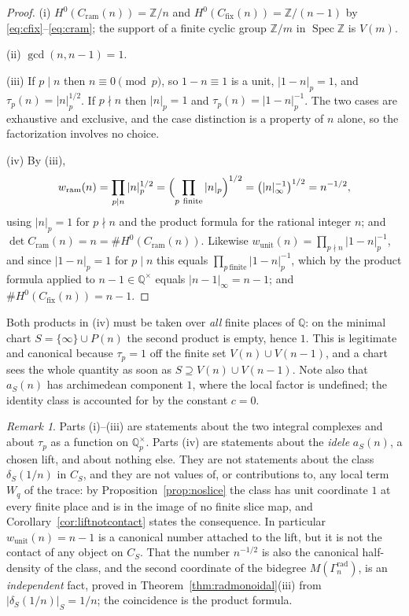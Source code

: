 \documentclass[11pt]{amsart}
\theoremstyle{definition}
\theoremstyle{remark}
\newtheorem{remark}[theorem]{Remark}
\newcommand{\Z}{\mathbb Z}
\newcommand{\Q}{\mathbb Q}
\newcommand{\Spec}{\operatorname{Spec}}
\begin{document}
\begin{proof}
(i) $H^0(C_{\mathrm{ram}}(n))=\Z/n$ and $H^0(C_{\mathrm{fix}}(n))=\Z/(n-1)$ by
\eqref{eq:cfix}--\eqref{eq:cram}; the support of a finite cyclic group $\Z/m$
in $\Spec\Z$ is $V(m)$.

(ii) $\gcd(n,n-1)=1$.

(iii) If $p\mid n$ then $n\equiv0\pmod p$, so $1-n\equiv1$ is a unit,
$|1-n|_p=1$, and $\tau_p(n)=|n|_p^{1/2}$. If $p\nmid n$ then $|n|_p=1$ and
$\tau_p(n)=|1-n|_p^{-1}$. The two cases are exhaustive and exclusive, and the
case distinction is a property of $n$ alone, so the factorization involves no
choice.

(iv) By (iii),
\[
  w_{\mathrm{ram}}(n)=\prod_{p\mid n}|n|_p^{1/2}
   =\Bigl(\prod_{p\ \mathrm{finite}}|n|_p\Bigr)^{1/2}
   =\bigl(|n|_\infty^{-1}\bigr)^{1/2}=n^{-1/2},
\]
using $|n|_p=1$ for $p\nmid n$ and the product formula for the rational integer
$n$; and $\det C_{\mathrm{ram}}(n)=n=\#H^0(C_{\mathrm{ram}}(n))$. Likewise
$w_{\mathrm{unit}}(n)=\prod_{p\nmid n}|1-n|_p^{-1}$, and since $|1-n|_p=1$ for
$p\mid n$ this equals $\prod_{p\ \mathrm{finite}}|1-n|_p^{-1}$, which by the
product formula applied to $n-1\in\Q^\times$ equals $|n-1|_\infty=n-1$; and
$\#H^0(C_{\mathrm{fix}}(n))=n-1$.
\end{proof}

Both products in (iv) must be taken over \emph{all} finite places of $\Q$: on
the minimal chart $S=\{\infty\}\cup P(n)$ the second product is empty, hence
$1$. This is legitimate and canonical because $\tau_p=1$ off the finite set
$V(n)\cup V(n-1)$, and a chart sees the whole quantity as soon as
$S\supseteq V(n)\cup V(n-1)$.  Note also that $a_S(n)$ has archimedean
component $1$, where the local factor is undefined; the identity class is
accounted for by the constant $c=0$.

\begin{remark}\label{rem:aboutthelift}
Parts (i)--(iii) are statements about the two integral complexes and about
$\tau_p$ as a function on $\Q_p^\times$. Parts (iv) are statements about the
\emph{idele} $a_S(n)$, a chosen lift, and about nothing else. They are not
statements about the class $\delta_S(1/n)$ in $C_S$, and they are not
values of, or contributions to, any local term $W_q$ of the trace: by
Proposition~\ref{prop:noslice} the class has unit coordinate $1$ at every
finite place and is in the image of no finite slice map, and
Corollary~\ref{cor:liftnotcontact} states the consequence.  In particular
$w_{\mathrm{unit}}(n)=n-1$ is a canonical number attached to the lift, but it
is not the contact of any object on $C_S$. That the number $n^{-1/2}$
is also the canonical half-density of the class, and the second coordinate of
the bidegree $M(\Gamma_n^{\mathrm{rad}})$, is an \emph{independent} fact, proved
in Theorem~\ref{thm:radmonoidal}(iii) from $|\delta_S(1/n)|_S=1/n$; the
coincidence is the product formula.
\end{remark}
\end{document}
